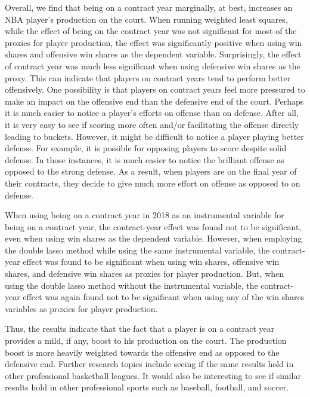 \documentclass[12pt]{article}
\begin{document}
	Overall, we find that being on a contract year marginally, at best, increases an NBA player's production on the court. When running weighted least squares, while the effect of being on the contract year was not significant for most of the proxies for player production, the effect was significantly positive when using win shares and offensive win shares as the dependent variable. Surprisingly, the effect of contract year was much less significant when using defensive win shares as the proxy. This can indicate that players on contract years tend to perform better offensively. One possibility is that players on contract years feel more pressured to make an impact on the offensive end than the defensive end of the court. Perhaps it is much easier to notice a player's efforts on offense than on defense. After all, it is very easy to see if scoring more often and/or facilitating the offense directly leading to buckets. However, it might be difficult to notice a player playing better defense. For example, it is possible for opposing players to score despite solid defense. In those instances, it is much easier to notice the brilliant offense as opposed to the strong defense. As a result, when players are on the final year of their contracts, they decide to give much more effort on offense as opposed to on defense. 

	When using being on a contract year in 2018 as an instrumental variable for being on a contract year, the contract-year effect was found not to be significant, even when using win shares as the dependent variable. However, when employing the double lasso method while using the same instrumental variable, the contract-year effect was found to be significant when using win shares, offensive win shares, and defensive win shares as proxies for player production. But, when using the double lasso method without the instrumental variable, the contract-year effect was again found not to be significant when using any of the win shares variables as proxies for player production. 
	
	Thus, the results indicate that the fact that a player is on a contract year provides a mild, if any, boost to his production on the court. The production boost is more heavily weighted towards the offensive end as opposed to the defensive end. Further research topics include seeing if the same results hold in other professional basketball leagues. It would also be interesting to see if similar results hold in other professional sports such as baseball, football, and soccer. 
	
\end{document}
